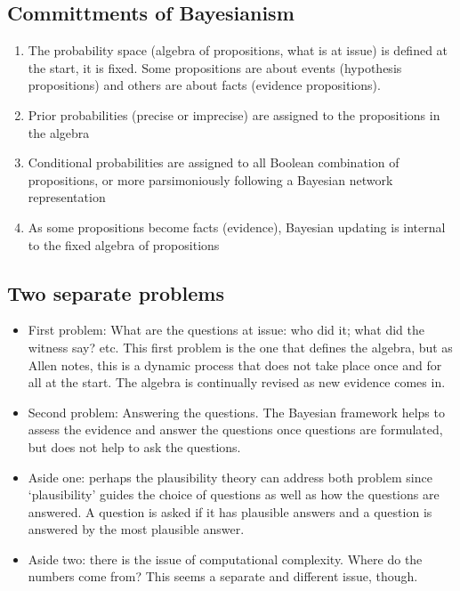 \documentclass[
  11pt,
  dvipsnames,enabledeprecatedfontcommands]{scrartcl}
\begin{document}
\hypertarget{committments-of-bayesianism}{%
\subsection{Committments of
Bayesianism}\label{committments-of-bayesianism}}

\begin{enumerate}
\def\labelenumi{\arabic{enumi}.}
\item
  The probability space (algebra of propositions, what is at issue) is
  defined at the start, it is fixed. Some propositions are about events
  (hypothesis propositions) and others are about facts (evidence
  propositions).
\item
  Prior probabilities (precise or imprecise) are assigned to the
  propositions in the algebra
\item
  Conditional probabilities are assigned to all Boolean combination of
  propositions, or more parsimoniously following a Bayesian network
  representation
\item
  As some propositions become facts (evidence), Bayesian updating is
  internal to the fixed algebra of propositions
\end{enumerate}

\hypertarget{two-separate-problems}{%
\subsection{Two separate problems}\label{two-separate-problems}}

\begin{itemize}
\item
  First problem: What are the questions at issue: who did it; what did
  the witness say? etc. This first problem is the one that defines the
  algebra, but as Allen notes, this is a dynamic process that does not
  take place once and for all at the start. The algebra is continually
  revised as new evidence comes in.
\item
  Second problem: Answering the questions. The Bayesian framework helps
  to assess the evidence and answer the questions once questions are
  formulated, but does not help to ask the questions.
\item
  Aside one: perhaps the plausibility theory can address both problem
  since `plausibility' guides the choice of questions as well as how the
  questions are answered. A question is asked if it has plausible
  answers and a question is answered by the most plausible answer.
\item
  Aside two: there is the issue of computational complexity. Where do
  the numbers come from? This seems a separate and different issue,
  though.
\end{itemize}
\end{document}
